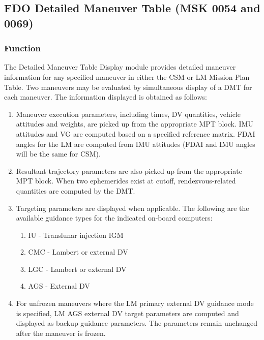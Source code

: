 \documentclass[11pt]{article} %
\begin{document}
\subsection{FDO Detailed Maneuver Table (MSK 0054 and 0069)}
\subsubsection{Function}
The Detailed Maneuver Table Display module provides detailed maneuver information for any specified maneuver in either the CSM or LM Mission Plan Table. Two  maneuvers may be evaluated by simultaneous display of a DMT for each maneuver. The information displayed is obtained as follows:
\begin{enumerate}
	\item Maneuver execution parameters, including times, DV quantities, vehicle attitudes and weights, are picked up from the appropriate MPT block. IMU attitudes and VG are computed based on a specified reference matrix. FDAI angles for the LM are computed from IMU attitudes (FDAI and IMU angles will be the same for CSM).
	\item Resultant trajectory parameters are also picked up from the appropriate MPT block. When two ephemerides exist at cutoff, rendezvous-related quantities are computed by the DMT.
	\item Targeting parameters are displayed when applicable. The following are the available guidance types for the indicated on-board computers:
	\begin{enumerate}
		\item IU - Translunar injection IGM
		\item CMC - Lambert or external DV
		\item LGC - Lambert or external DV
		\item AGS - External DV
	\end{enumerate}
	\item For unfrozen maneuvers where the LM primary external DV guidance mode is specified, LM AGS external DV target parameters are computed and displayed as backup guidance parameters. The parameters remain unchanged after the maneuver is frozen.
\end{enumerate}
\newpage
\end{document}
